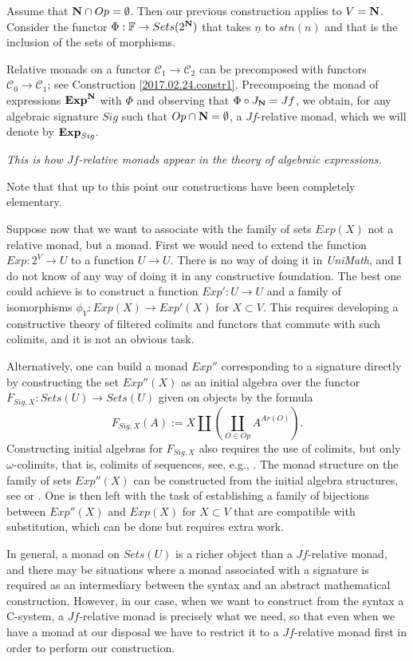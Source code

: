\documentclass[12pt]{amsart}
\newcommand{\sr}{\rightarrow}
\newcommand{\nn}{{\bf N\rm}}
\newcommand{\nat}{\nn}
\newcommand{\uu}{\underline}
\newcommand{\C}{{\mathcal C}}
\newcommand{\FF}{{\mathbb F}}
\newcommand{\ff}[1]{\uu{#1}}
\begin{document}
Assume that $\nat\cap Op=\emptyset$. Then our previous construction applies to
$V=\nat$. Consider the functor $\Phi:\FF\sr Sets(2^{\nat})$ that takes $\ff{n}$
to $stn(n)$ and that is the inclusion of the sets of morphisms.

Relative monads on a functor $\C_1\sr \C_2$ can be precomposed with functors $\C_0\sr\C_1$; see Construction \ref{2017.02.24.constr1}. Precomposing the monad of expressions ${\bf Exp}^{\nat}$ with $\Phi$ and observing that $\Phi\circ J_{\nat}=Jf$, we obtain, for any algebraic signature $Sig$ such that $Op\cap \nat=\emptyset$, a $Jf$-relative monad, which we will denote by ${\bf Exp}_{Sig}$. 

{\em This is how $Jf$-relative monads appear in the theory of algebraic expressions.} 

Note that that up to this point our constructions have been completely elementary. 

Suppose now that we want to associate with the family of sets $Exp(X)$ not a
relative monad, but a monad. First we would need to extend the function
$Exp:2^V\sr U$ to a function $U\sr U$. There is no way of doing it in
{\em UniMath}, and I do not know of any way of doing it in any constructive
foundation. The best one could achieve is to construct a function $Exp':U\sr U$
and a family of isomorphisms $\phi_V:Exp(X)\sr Exp'(X)$ for $X\subset V$. This
requires developing a constructive theory of filtered colimits and functors
that commute with such colimits, and it is not an obvious task.

Alternatively, one can build a monad $Exp''$ corresponding to a signature
directly by constructing the set $Exp''(X)$ as an initial algebra over the
functor $F_{Sig,X}:Sets(U)\sr Sets(U)$ given on objects by the formula
%
$$F_{Sig,X}(A):=X\coprod(\coprod_{O\in Op}A^{Ar(O)}).$$
%
Constructing initial algebras for $F_{Sig,X}$ also requires the use of
colimits, but only $\omega$-colimits, that is, colimits of sequences, see,
e.g., \cite{Adamek1974}. The monad structure on the family of sets $Exp''(X)$
can be constructed from the initial algebra structures, see \cite{Barr1970} or
\cite[Th.3, p.~161]{MatthesUustalu}. One is then left with the task of
establishing a family of bijections between $Exp''(X)$ and $Exp(X)$ for
$X\subset V$ that are compatible with substitution, which can be done but
requires extra work.

In general, a monad on $Sets(U)$ is a richer object than a $Jf$-relative monad,
and there may be situations where a monad associated with a signature is
required as an intermediary between the syntax and an abstract mathematical
construction. However, in our case, when we want to construct from the syntax a
C-system, a $Jf$-relative monad is precisely what we need, so that even when we
have a monad at our disposal we have to restrict it to a $Jf$-relative monad
first in order to perform our construction.
\end{document}
